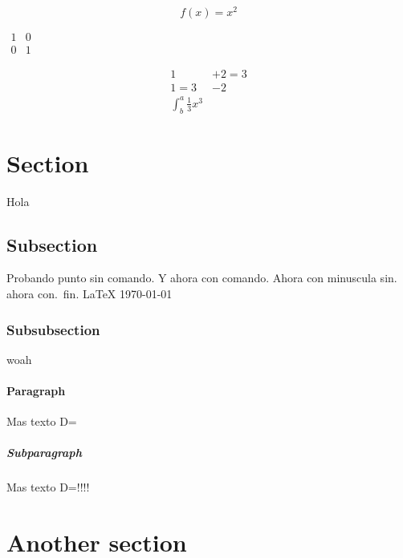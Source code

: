 \documentclass[a4paper]{article}
\begin{document}

\begin{equation*} 
	f(x)=x^2
\end{equation*}

$\begin{matrix}
 1 & 0\\
 0 & 1
\end{matrix}$

\begin{align*}
	1 &+ 2 = 3\\
	1 = 3 &- 2\\
	\int^a_b \frac{1}{3}x^3
 \end{align*}


\section{Section}

Hola

\subsection{Subsection}

Probando punto sin comando. Y ahora con comando\@. Ahora con minuscula sin. ahora con.\ fin.
\LaTeX
\today

\subsubsection{Subsubsection}
woah

\paragraph{Paragraph}
Mas texto D=

\subparagraph{Subparagraph}

Mas texto D=!!!!
 
\section{Another section}
\end{document}
